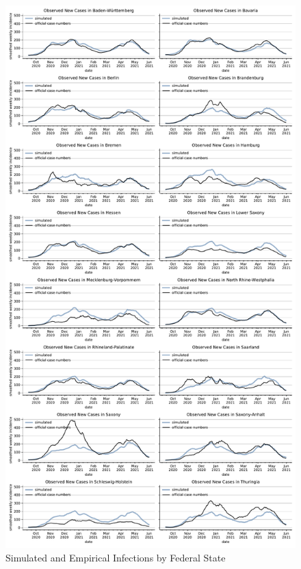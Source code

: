 \begin{figure}[ht]
\centering
  \includegraphics[width=\textwidth]{../figures/results/figures/incidences_by_group/state/full_combined_baseline_new_known_case}
\caption{Simulated and Empirical Infections by Federal State}
\label{fig:state_fit}
\end{figure}



